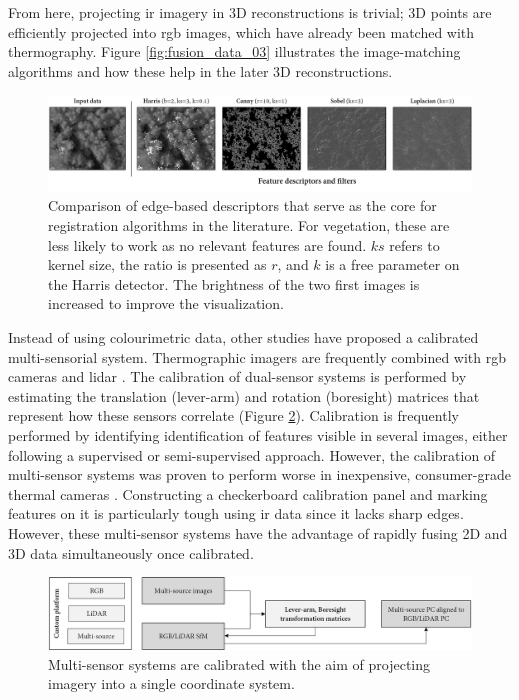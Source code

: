 From here, projecting \acrshort{ir} imagery in 3D reconstructions is trivial; 3D points are efficiently projected into \acrshort{rgb} images, which have already been matched with thermography. Figure \ref{fig:fusion_data_03} illustrates the image-matching algorithms and how these help in the later 3D reconstructions. 

\begin{figure}[ht]
	\includegraphics[width=\linewidth]{figs/context/feature_detection.png}
	\caption{Comparison of edge-based descriptors that serve as the core for registration algorithms in the literature. For vegetation, these are less likely to work as no relevant features are found. $\textit{ks}$ refers to kernel size, the ratio is presented as $\textit{r}$, and $\textit{k}$ is a free parameter on the Harris detector. The brightness of the two first images is increased to improve the visualization.}
    \label{fig:feature_detection}
\end{figure}

Instead of using colourimetric data, other studies have proposed a calibrated multi-sensorial system. Thermographic imagers are frequently combined with \acrshort{rgb} cameras \cite{javadnejad_photogrammetric_2020, landmann_multimodal_2019, adan_fusion_2017} and \acrshort{lidar} \cite{adan_fusion_2017, hoegner_fusion_2018}. The calibration of dual-sensor systems is performed by estimating the translation (lever-arm) and rotation (boresight) matrices that represent how these sensors correlate (Figure \ref{fig:fusion_data_04}). Calibration is frequently performed by identifying identification of features visible in several images, either following a supervised or semi-supervised approach. However, the calibration of multi-sensor systems was proven to perform worse in inexpensive, consumer-grade thermal cameras \cite{javadnejad_photogrammetric_2020}. Constructing a checkerboard calibration panel and marking features on it is particularly tough using \acrshort{ir} data \cite{javadnejad_photogrammetric_2020} since it lacks sharp edges. However, these multi-sensor systems have the advantage of rapidly fusing 2D and 3D data simultaneously once calibrated.

\begin{figure}[ht]
	\includegraphics[width=\linewidth]{figs/context/fusion_04.png}
	\caption{Multi-sensor systems are calibrated with the aim of projecting imagery into a single coordinate system.}
    \label{fig:fusion_data_04}
\end{figure}

